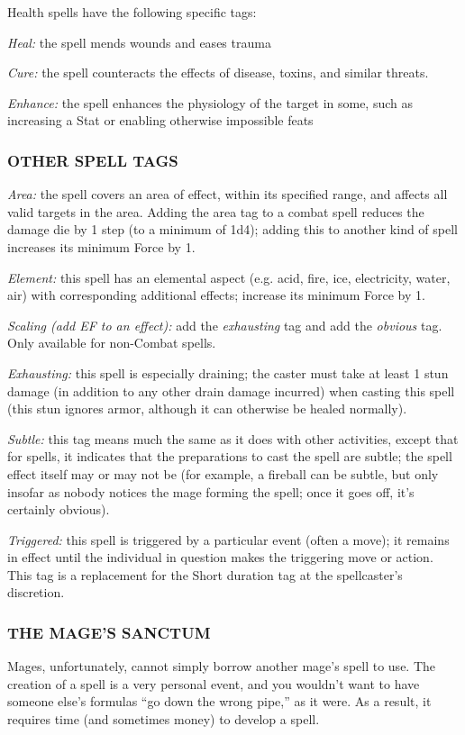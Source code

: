 \documentclass[oneside,10pt]{article}
\begin{document}
\begin{multicols}{2}
Health spells have the following specific tags:
\begin{dent}

\textit{Heal:} the spell mends wounds and eases trauma

\textit{Cure:} the spell counteracts the effects of disease, toxins,
and similar threats.

\textit{Enhance:} the spell enhances the physiology of the target
in some, such as increasing a Stat or enabling otherwise
impossible feats
\end{dent}
\subsubsection{OTHER SPELL TAGS}
\begin{dent}

\textit{Area:} the spell covers an area of effect, within its specified
range, and affects all valid targets in the area. Adding the
area tag to a combat spell reduces the damage die by 1
step (to a minimum of 1d4); adding this to another kind of
spell increases its minimum Force by 1.

\textit{Element:} this spell has an elemental aspect (e.g. acid, fire,
ice, electricity, water, air) with corresponding additional
effects; increase its minimum Force by 1.

\textit{Scaling (add EF to an effect):} add the \textit{exhausting} tag and add the \textit{obvious} tag. Only available for non-Combat spells.

\textit{Exhausting:} this spell is especially draining; the caster must
take at least 1 stun damage (in addition to any other drain damage incurred) when casting this spell (this stun ignores armor, although it can otherwise be healed normally).

\textit{Subtle:} this tag means much the same as it does with other
activities, except that for spells, it indicates that the preparations to cast the spell are subtle; the spell effect itself
may or may not be (for example, a fireball can be subtle,
but only insofar as nobody notices the mage forming the
spell; once it goes off, it’s certainly obvious).

\textit{Triggered:} this spell is triggered by a particular event (often
a move); it remains in effect until the individual in question makes the triggering move or action. This tag is a
replacement for the Short duration tag at the spellcaster’s
discretion.
\end{dent}
\subsubsection{THE MAGE'S SANCTUM}
Mages, unfortunately, cannot simply borrow another mage’s
spell to use. The creation of a spell is a very personal event,
and you wouldn’t want to have someone else’s formulas ``go
down the wrong pipe,'' as it were. As a result, it requires time
(and sometimes money) to develop a spell.


\end{multicols}
\end{document}
